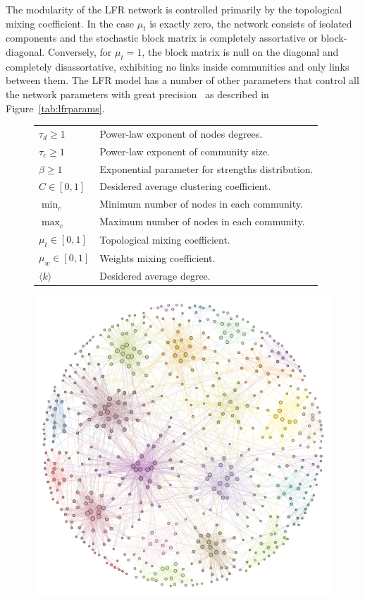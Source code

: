 \documentclass[11pt,              a4paper,              twoside,openright,              titlepage,              headinclude,footinclude,                            numbers=noenddot,              cleardoublepage=empty,]{scrreprt}
\begin{document}
The modularity of the LFR network is controlled primarily by the topological mixing coefficient.
In the case $\mu_t$ is exactly zero, the network consists of isolated components and the stochastic block matrix is completely assortative or block-diagonal.
Conversely, for $\mu_t=1$, the block matrix is null on the diagonal and completely disassortative, exhibiting no links inside communities and only links between them.
The LFR model has a number of other parameters that control all the network parameters with great precision~\cite{lancichinetti2008,lancichinetti2009a} as described in Figure~\ref{tab:lfrparams}.
\begin{figure}[htb!]\centering
\begin{footnotesize}
\noindent\begin{minipage}[b!]{0.5\textwidth}
\begin{tabular}{l p{}}
$\tau_d \geq 1$ & Power-law exponent of nodes degrees.\\
$\tau_c \geq 1$ & Power-law exponent of community size.\\
$\beta \geq 1$  &Exponential parameter for strengths distribution.\\
$C \in [0,1]$ & Desidered average clustering coefficient.\\
$\min_c$ & Minimum number of nodes in each community.\\
$\max_c$  & Maximum number of nodes in each community.\\
$\mu_t \in [0,1]$ & Topological mixing coefficient.\\
$\mu_w \in [0,1]$ & Weights mixing coefficient.\\
$\langle k\rangle $ &Desidered average degree.\\
\end{tabular}
\end{minipage}\hfill
\begin{minipage}[b!]{0.35\textwidth}\flushright
\includegraphics[width=1\textwidth]{images/LFRexample.pdf}

\end{minipage}
\end{footnotesize}
\end{figure}
\end{document}
